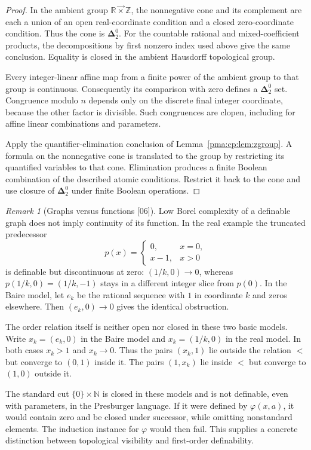 \documentclass[11pt]{article}
\numberwithin{equation}{section}
\theoremstyle{definition}
\theoremstyle{remark}
\newtheorem{remark}[remark]{Remark}
\newcommand{\N}{\mathbb N}
\newcommand{\Z}{\mathbb Z}
\newcommand{\R}{\mathbb R}
\newcommand{\lex}{\mathbin{\overrightarrow\times}}
\newcommand{\src}[1]{\textup{\textsf{\small[#1]}}}
\begin{document}
\begin{proof}
In the ambient group $\R\lex\Z$, the nonnegative cone and its
complement are each a union of an open real-coordinate condition and
a closed zero-coordinate condition. Thus the cone is
$\boldsymbol\Delta^0_2$. For the countable rational and mixed-coefficient
products, the decompositions by first nonzero index used above give
the same conclusion. Equality is closed in the ambient Hausdorff
topological group.

Every integer-linear affine map from a finite power of the ambient
group to that group is continuous. Consequently its comparison with
zero defines a $\boldsymbol\Delta^0_2$ set. Congruence modulo $n$
depends only on the discrete final integer coordinate, because the
other factor is divisible. Such congruences are clopen, including
for affine linear combinations and parameters.

Apply the quantifier-elimination conclusion of
Lemma~\ref{pma:cp:lem:zgroup}. A formula on the nonnegative cone is translated
to the group by restricting its quantified variables to that cone.
Elimination produces a finite Boolean combination of the described
atomic conditions. Restrict it back to the cone and use closure of
$\boldsymbol\Delta^0_2$ under finite Boolean operations.
\end{proof}

\begin{remark}[Graphs versus functions \src{06}]
Low Borel complexity of a definable graph does not imply continuity
of its function. In the real example the truncated predecessor
\[
 p(x)=\begin{cases}0,&x=0,\\x-1,&x>0\end{cases}
\]
is definable but discontinuous at zero: $(1/k,0)\to0$, whereas
$p(1/k,0)=(1/k,-1)$ stays in a different integer slice from $p(0)$.
In the Baire model, let $e_k$ be the rational sequence with $1$ in
coordinate $k$ and zeros elsewhere. Then $(e_k,0)\to0$ gives the
identical obstruction.

The order relation itself is neither open nor closed in these two
basic models. Write $x_k=(e_k,0)$ in the Baire model and
$x_k=(1/k,0)$ in the real model. In both cases $x_k>1$ and $x_k\to0$.
Thus the pairs $(x_k,1)$ lie outside the relation $<$ but converge to
$(0,1)$ inside it. The pairs $(1,x_k)$ lie inside $<$ but converge to
$(1,0)$ outside it.
\end{remark}

The standard cut $\{0\}\times\N$ is closed in these models and is
not definable, even with parameters, in the Presburger language. If it
were defined by $\varphi(x,a)$, it would contain zero and be closed
under successor, while omitting nonstandard elements. The induction
instance for $\varphi$ would then fail. This supplies a concrete
distinction between topological visibility and first-order definability.
\end{document}
